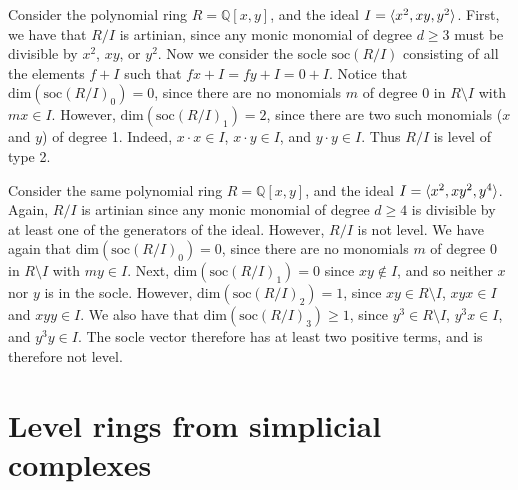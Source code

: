 \begin{example} Consider the polynomial ring $R = \mathbb{Q}[x, y]$, and the ideal $I = \langle x^2, xy, y^2 \rangle$. First, we have that $R/I$ is artinian, since any monic monomial of degree $d \geq 3$ must be divisible by $x^2$, $xy$, or $y^2$. Now we consider the socle $\textrm{soc} (R/I)$ consisting of all the elements $f+I$ such that $f x + I = fy + I = 0 + I$. Notice that $\textrm{dim}(\textrm{soc} (R/I)_0) = 0$, since there are no monomials $m$ of degree 0 in $R \setminus I$ with $m x \in I$. However, $\textrm{dim}(\textrm{soc} (R/I)_1) = 2$, since there are two such monomials ($x$ and $y$) of degree 1. Indeed, $x \cdot x \in I$, $x \cdot y \in I$, and $y \cdot y \in I$. Thus $R/I$ is level of type 2.
\end{example}

\begin{example} Consider the same polynomial ring $R = \mathbb{Q}[x, y]$, and the ideal $I = \langle x^2, xy^2, y^4 \rangle$. Again, $R/I$ is artinian since any monic monomial of degree $d \geq 4$ is divisible by at least one of the generators of the ideal. However, $R/I$ is not level. We have again that $\textrm{dim}(\textrm{soc}(R/I)_0) = 0$, since there are no monomials $m$ of degree 0 in $R \setminus I$ with $m y \in I$. Next, $\textrm{dim}(\textrm{soc}(R/I)_1) = 0$ since $xy \not \in I$, and so neither $x$ nor $y$ is in the socle. However, $\textrm{dim}(\textrm{soc}(R/I)_2) = 1$, since $xy \in R \setminus I$, $xyx \in I$ and $xyy \in I$. We also have that  $\textrm{dim}(\textrm{soc}(R/I)_3) \geq 1$, since $y^3 \in R \setminus I$,  $y^3 x \in I$, and $y^3 y \in I$. The socle vector therefore has at least two positive terms, and is therefore not level. 
\end{example}

\section{Level rings from simplicial complexes} \label{sec:simplicial}

